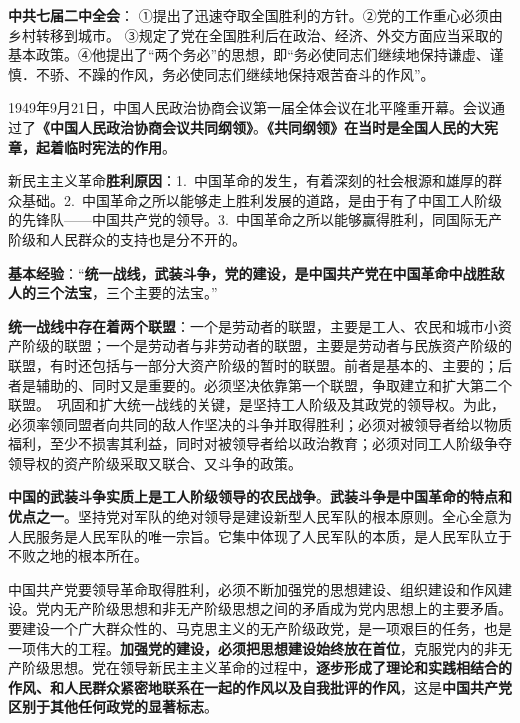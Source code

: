{\textbf{{中共七届二中全会}}：
①提出了迅速夺取全国胜利的方针。②党的工作重心必须由乡村转移到城市。
③规定了党在全国胜利后在政治、经济、外交方面应当采取的基本政策。④他提出了``两个务必''的思想，即``{务必使同志们继续地保持谦虚、谨慎．不骄、不躁的作风，务必使同志们继续地保持艰苦奋斗的作风}''。}

{1949年9月21日，{中国人民政治协商会议第一届全体会议}在北平隆重开幕。会议通过了\textbf{{《中国人民政治协商会议共同纲领》}}。\textbf{{《共同纲领》在当时是全国人民的大宪章，起着临时宪法的作用}}。}

{新民主主义革命\textbf{{胜利原因}}：{1.}~{中国革命的发生，有着深刻的社会根源和雄厚的群众基础。2.~中国革命之所以能够走上胜利发展的道路，是由于有了中国工人阶级的先锋队------中国共产党的领导。3.~中国革命之所以能够赢得胜利，同国际无产阶级和人民群众的支持也是分不开的}。}

{\textbf{{基本经验}}：``\textbf{{统一战线，武装斗争，党的建设，是中国共产党在中国革命中战胜敌人的三个法宝}}，三个主要的法宝。''}

{\textbf{{统一战线中存在着两个联盟}}：{一个是劳动者的联盟}，主要是工人、农民和城市小资产阶级的联盟；{一个是劳动者与非劳动者的联盟}，主要是劳动者与民族资产阶级的联盟，有时还包括与一部分大资产阶级的暂时的联盟。前者是基本的、主要的；后者是辅助的、同时又是重要的。{必须坚决依靠第一个联盟，争取建立和扩大第二个联盟}。~{巩固和扩大统一战线的关键，是坚持工人阶级及其政党的领导权}。为此，必须率领同盟者向共同的敌人作坚决的斗争并取得胜利；必须对被领导者给以物质福利，至少不损害其利益，同时对被领导者给以政治教育；必须对同工人阶级争夺领导权的资产阶级采取又联合、又斗争的政策。}

{\textbf{{中国的武装斗争实质上是工人阶级领导的农民战争}}。\textbf{{武装斗争是中国革命的特点和优点之一}}。{坚持党对军队的绝对领导是建设新型人民军队的根本原则}。{全心全意为人民服务是人民军队的唯一宗旨。它集中体现了人民军队的本质，是人民军队立于不败之地的根本所在}。}

{{中国共产党要领导革命取得胜利，必须不断加强党的思想建设、组织建设和作风建设}{。}{党内无产阶级思想和非无产阶级思想之间的矛盾成为党内思想上的主要矛盾}{。要建设一个广大群众性的、马克思主义的无产阶级政党，是一项艰巨的任务，也}{是一项伟大的工程}{。}\textbf{{加强党的建设，必须把思想建设始终放在首位}}{，克服党内的非无产阶级思想。党在领导新民主主义革命的过程中，}\textbf{{逐步形成了理论和实践相结合的作风、和人民群众紧密地联系在一起的作风以及自我批评的作风}}{，这是}\textbf{{中国共产党区别于其他任何政党的显著标志}}{。}}
